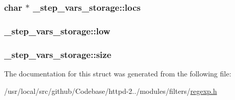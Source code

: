 \subsubsection[{\texorpdfstring{locs}{locs}}]{\setlength{\rightskip}{0pt plus 5cm}char $\ast$ \+\_\+step\+\_\+vars\+\_\+storage\+::locs}\hypertarget{struct__step__vars__storage_afcf295bdc236d6ed622674ab0052391b}{}\label{struct__step__vars__storage_afcf295bdc236d6ed622674ab0052391b}
\subsubsection[{\texorpdfstring{low}{low}}]{ \+\_\+step\+\_\+vars\+\_\+storage\+::low}\hypertarget{struct__step__vars__storage_a22668c96f153818834a61a2350ad7e69}{}\label{struct__step__vars__storage_a22668c96f153818834a61a2350ad7e69}
\subsubsection[{\texorpdfstring{size}{size}}]{ \+\_\+step\+\_\+vars\+\_\+storage\+::size}\hypertarget{struct__step__vars__storage_a1e561032df1d11195acbb7470b159ec4}{}\label{struct__step__vars__storage_a1e561032df1d11195acbb7470b159ec4}


The documentation for this struct was generated from the following file\+:\begin{DoxyCompactItemize}
\item 
/usr/local/src/github/\+Codebase/httpd-\/2../modules/filters/\hyperlink{regexp_8h}{regexp.\+h}\end{DoxyCompactItemize}
